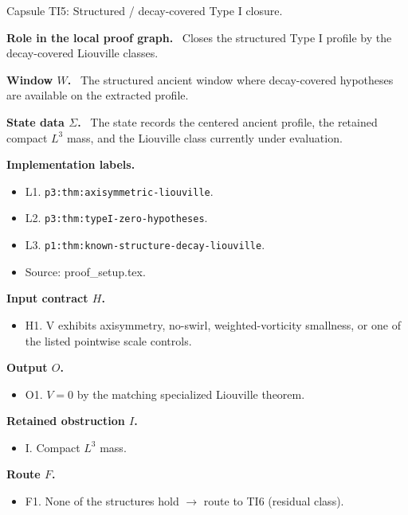 \documentclass[11pt]{amsart}
\newcommand{\capsulefield}[1]{\par\smallskip\noindent\textbf{#1.}\ }
\begin{document}
\begin{proofcapsule}{Capsule TI5: Structured / decay-covered Type I closure.}
  \capsulefield{Role in the local proof graph}
  Closes the structured Type I profile by the decay-covered Liouville classes.

  \capsulefield{Window \(W\)}
The structured ancient window where decay-covered hypotheses are available on the extracted profile.

  \capsulefield{State data \(\Sigma\)}
The state records the centered ancient profile, the retained compact $L^3$ mass, and the Liouville class currently under evaluation.

  \capsulefield{Implementation labels}
  \begin{itemize}[leftmargin=1.8em]
  \item L1. \texttt{p3:thm:axisymmetric-liouville}.
  \item L2. \texttt{p3:thm:typeI-zero-hypotheses}.
  \item L3. \texttt{p1:thm:known-structure-decay-liouville}.
  \item Source: proof\_setup.tex.
  \end{itemize}

  \capsulefield{Input contract \(H\)}
  \begin{itemize}[leftmargin=1.8em]
  \item H1. V exhibits axisymmetry, no-swirl, weighted-vorticity smallness, or one of the listed pointwise scale controls.
  \end{itemize}

  \capsulefield{Output \(O\)}
  \begin{itemize}[leftmargin=1.8em]
  \item O1. \(V=0\) by the matching specialized Liouville theorem.
  \end{itemize}

  \capsulefield{Retained obstruction \(I\)}
  \begin{itemize}[leftmargin=1.8em]
  \item I. Compact $L^3$ mass.
  \end{itemize}

  \capsulefield{Route \(F\)}
  \begin{itemize}[leftmargin=1.8em]
  \item F1. None of the structures hold $\to$ route to TI6 (residual class).
  \end{itemize}


\end{proofcapsule}
\end{document}
